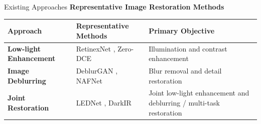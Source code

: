\documentclass[
    11pt,%
    aspectratio=169,%
]{beamer}
\begin{document}
\begin{frame}{Existing Approaches}
\small
{\color{Navy}\bfseries
Representative Image Restoration Methods}

\vspace{0.12cm}

\renewcommand{\arraystretch}{1.5}

\begin{tabularx}{\textwidth}{
    >{\raggedright\arraybackslash}p{}
    >{\raggedright\arraybackslash}p{}
    >{\raggedright\arraybackslash}X
}

\toprule

\textbf{\color{Navy}Approach} &
\textbf{\color{Navy}Representative Methods} &
\textbf{\color{Navy}Primary Objective} \\

\midrule

\textbf{Low-light Enhancement} & RetinexNet \cite{wei2018retinexnet}, Zero-DCE \cite{guo2020zerodce} & Illumination and contrast enhancement \\
\textbf{Image Deblurring} & DeblurGAN \cite{kupyn2018deblurgan}, NAFNet \cite{chen2022nafnet} & Blur removal and detail restoration \\
\textbf{Joint Restoration} & LEDNet \cite{zhou2022lednet}, DarkIR \cite{feijoo2025darkir} & Joint low-light enhancement and deblurring / multi-task restoration \\
\bottomrule
\end{tabularx}
\vspace{0.3cm}
\end{frame} 
\end{document}
